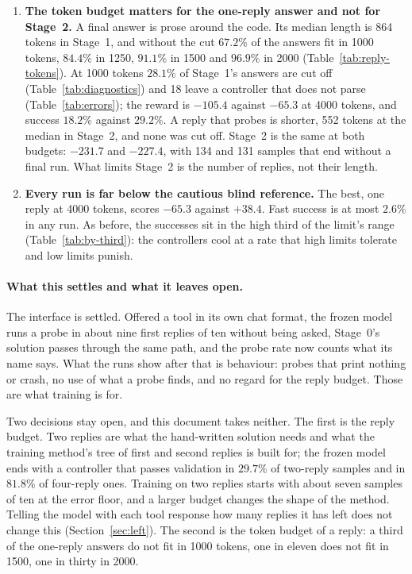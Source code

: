 \documentclass[11pt,a4paper]{article}
\begin{document}
\begin{enumerate}[leftmargin=1.5em]
  \item \textbf{The token budget matters for the one-reply answer and not
  for Stage~2.} \label{it:tokens} A final answer is prose around the code. Its median length
  is 864 tokens in Stage~1, and without the cut $67.2\%$ of the answers fit
  in 1000 tokens, $84.4\%$ in 1250, $91.1\%$ in 1500 and $96.9\%$ in 2000
  (Table~\ref{tab:reply-tokens}). At 1000 tokens $28.1\%$ of Stage~1's
  answers are cut off (Table~\ref{tab:diagnostics}) and 18 leave a
  controller that does not parse (Table~\ref{tab:errors}); the reward is
  $-105.4$ against $-65.3$ at 4000 tokens, and success $18.2\%$ against
  $29.2\%$. A reply that probes is shorter, 552 tokens at the median in
  Stage~2, and none was cut off. Stage~2 is the same at both budgets:
  $-231.7$ and $-227.4$, with 134 and 131 samples that end without a final
  run. What limits Stage~2 is the number of replies, not their length.

  \item \textbf{Every run is far below the cautious blind reference.} The
  best, one reply at 4000 tokens, scores $-65.3$ against $+38.4$. Fast
  success is at most $2.6\%$ in any run. As before, the successes sit in
  the high third of the limit's range (Table~\ref{tab:by-third}): the
  controllers cool at a rate that high limits tolerate and low limits
  punish.
\end{enumerate}

\paragraph{What this settles and what it leaves open.} The interface is
settled. Offered a tool in its own chat format, the frozen model runs a
probe in about nine first replies of ten without being asked, Stage~0's
solution passes through the same path, and the probe rate now counts what
its name says. What the runs show after that is behaviour: probes that
print nothing or crash, no use of what a probe finds, and no regard for the
reply budget. Those are what training is for.

Two decisions stay open, and this document takes neither. The first is the
reply budget. Two replies are what the hand-written solution needs and
what the training method's tree of first and second replies is built for;
the frozen model ends with a controller that passes validation in $29.7\%$
of two-reply samples and in $81.8\%$ of four-reply ones. Training on two replies starts with about
seven samples of ten at the error floor, and a larger budget changes the
shape of the method. Telling the model with each tool response how many
replies it has left does not change this (Section~\ref{sec:left}). The
second is the token budget
of a reply: a third of the one-reply answers do not fit in 1000 tokens,
one in eleven does not fit in 1500, one in thirty in 2000.
\end{document}
